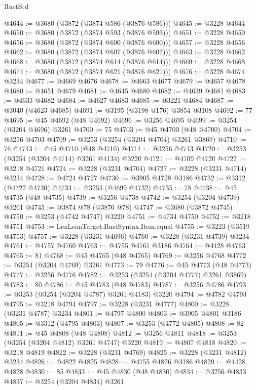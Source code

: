 \begin{lexlean}{RustStd}
\begin{coremodule}
{\begin{coremodule}
{{{{{{{{{{{{{{{{{{{{{{{{{{{{{{{{{{{{{@4644 := @3680 (@3872 (@3874 @586 (@3876 @586)))
@4645 := @3228 @4644
@4650 := @3680 (@3872 (@3874 @593 (@3876 @593)))
@4651 := @3228 @4650
@4656 := @3680 (@3872 (@3874 @600 (@3876 @600)))
@4657 := @3228 @4656
@4662 := @3680 (@3872 (@3874 @607 (@3876 @607)))
@4663 := @3228 @4662
@4668 := @3680 (@3872 (@3874 @614 (@3876 @614)))
@4669 := @3228 @4668
@4674 := @3680 (@3872 (@3874 @621 (@3876 @621)))
@4676 := @3228 @4674 @3234
@4677 := @4669 @4676
@4678 := @4663 @4677
@4679 := @4657 @4678
@4680 := @4651 @4679
@4681 := @4645 @4680
@4682 := @4639 @4681
@4683 := @4633 @4682
@4684 := @4627 @4683
@4685 := @3221 @4684
@4687 := @3040 (@4623 @4685)
@4691 := @3195 (@3198 @176) @3854 @3108
@4692 := 77
@4695 := @45 @4692 (@48 @4692)
@4696 := @3256 @4695
@4699 := @3254 (@3204 @4696) @3261
@4700 := 75
@4703 := @45 @4700 (@48 @4700)
@4704 := @3256 @4703
@4709 := @3253 (@3254 (@3204 @4704) @3261 @3869)
@4710 := 76
@4713 := @45 @4710 (@48 @4710)
@4714 := @3256 @4713
@4720 := @3253 (@3254 (@3204 @4714) @3261 @4134) @3220
@4721 := @4709 @4720
@4722 := @3218 @4721
@4724 := @3228 (@3231 @4704)
@4727 := @3228 (@3231 @4714) @3234
@4728 := @4724 @4727
@4730 := @3905 @4728 @3186
@4732 := @3312 (@4722 @4730)
@4734 := @3253 (@4699 @4732)
@4735 := 78
@4738 := @45 @4735 (@48 @4735)
@4739 := @3256 @4738
@4742 := @3254 (@3204 @4739) @3261
@4745 := @3874 @78 (@3876 @78)
@4747 := @3680 (@3872 @4745)
@4750 := @3253 (@4742 @4747) @3220
@4751 := @4734 @4750
@4752 := @3218 @4751
@4753 := LexLeanTarget.RustSyntax.Item.equal
@4755 := @3223 (@3519 @4753)
@4757 := @3228 (@3231 @4696)
@4760 := @3228 (@3231 @4739) @3234
@4761 := @4757 @4760
@4763 := @4755 @4761 @3186
@4764 := @4428 @4763
@4765 := 81
@4768 := @45 @4765 (@48 @4765)
@4769 := @3256 @4768
@4772 := @3254 (@3204 @4769) @3261
@4773 := 79
@4776 := @45 @4773 (@48 @4773)
@4777 := @3256 @4776
@4782 := @3253 (@3254 (@3204 @4777) @3261 @3869)
@4783 := 80
@4786 := @45 @4783 (@48 @4783)
@4787 := @3256 @4786
@4793 := @3253 (@3254 (@3204 @4787) @3261 @4183) @3220
@4794 := @4782 @4793
@4795 := @3218 @4794
@4797 := @3228 (@3231 @4777)
@4800 := @3228 (@3231 @4787) @3234
@4801 := @4797 @4800
@4803 := @3905 @4801 @3186
@4805 := @3312 (@4795 @4803)
@4807 := @3253 (@4772 @4805)
@4808 := 82
@4811 := @45 @4808 (@48 @4808)
@4812 := @3256 @4811
@4818 := @3253 (@3254 (@3204 @4812) @3261 @4747) @3220
@4819 := @4807 @4818
@4820 := @3218 @4819
@4822 := @3228 (@3231 @4769)
@4825 := @3228 (@3231 @4812) @3234
@4826 := @4822 @4825
@4828 := @4755 @4826 @3186
@4829 := @4428 @4828
@4830 := 85
@4833 := @45 @4830 (@48 @4830)
@4834 := @3256 @4833
@4837 := @3254 (@3204 @4834) @3261
}}}}}}}}}}}}}}}}}}}}}}}}}}}}}}}}}}}}}
\end{coremodule}}
\end{coremodule}
\end{lexlean}
